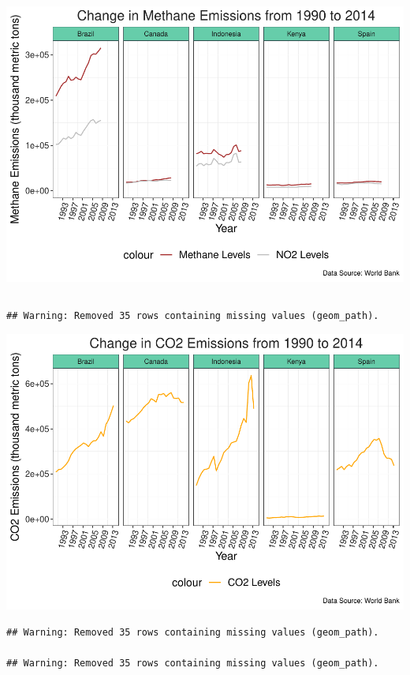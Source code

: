 \documentclass[12pt,]{article}
\begin{document}
\includegraphics{Marx_ENV872_Project_files/figure-latex/unnamed-chunk-7-1.pdf}

\begin{verbatim}
\end{verbatim}

\begin{verbatim}
## Warning: Removed 35 rows containing missing values (geom_path).
\end{verbatim}

\includegraphics{Marx_ENV872_Project_files/figure-latex/unnamed-chunk-8-1.pdf}

\begin{verbatim}
## Warning: Removed 35 rows containing missing values (geom_path).

## Warning: Removed 35 rows containing missing values (geom_path).
\end{verbatim}
\end{document}
